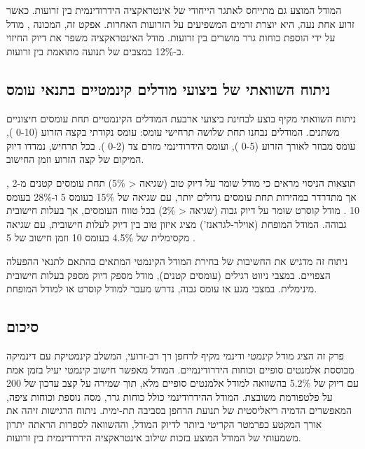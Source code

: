 המודל המוצע גם מתייחס לאתגר הייחודי של אינטראקציה הידרודינמית בין זרועות. כאשר זרוע אחת נעה, היא יוצרת זרמים המשפיעים על הזרועות האחרות. אפקט זה, המכונה , מודל על ידי הוספת כוחות גרר מושרים בין זרועות. מודל האינטראקציה משפר את דיוק החיזוי ב-12\% במצבים של תנועה מתואמת בין זרועות.

\subsection{ניתוח השוואתי של ביצועי מודלים קינמטיים בתנאי עומס}
\label{sec:kinematics_load_analysis}

ניתוח השוואתי מקיף בוצע לבחינת ביצועי ארבעת המודלים הקינמטיים תחת עומסים חיצוניים משתנים. המודלים נבחנו תחת שלושה תרחישי עומס: עומס נקודתי בקצה הזרוע (0-10 ), עומס מבוזר לאורך הזרוע (0-5 ), ועומס הידרודינמי מזרם צד (0-2 ). בכל תרחיש, נמדדו דיוק המיקום של קצה הזרוע וזמן החישוב.

תוצאות הניסוי מראים כי מודל  שומר על דיוק טוב (שגיאה < 5\%) תחת עומסים קטנים מ-2 , אך מתדרדר במהירות תחת עומסים גדולים יותר, עם שגיאה של 15\% בעומס 5  ו-28\% בעומס 10 . מודל קוסרט שומר על דיוק גבוה (שגיאה < 2\%) בכל טווח העומסים, אך בעלות חישובית גבוהה. המודל המופחת (אוילר-לגראנז') מציג איזון טוב בין דיוק לעלות חישובית, עם שגיאה מקסימלית של 4.5\% בעומס 10  וזמן חישוב של 5 .

ניתוח זה מדגיש את החשיבות של בחירת המודל הקינמטי המתאים בהתאם לתנאי ההפעלה הצפויים. במצבי ניווט רגילים (עומסים קטנים), מודל  מספק דיוק מספק בעלות חישובית מינימלית. במצבי מגע או עומס גבוה, נדרש מעבר למודל קוסרט או למודל המופחת.

\subsection{סיכום}
\label{sec:kinematics_summary}

פרק זה הציג מודל קינמטי ודינמי מקיף לרחפן רך רב-זרועי, המשלב קינמטיקת  עם דינמיקה מבוססת אלמנטים סופיים וכוחות הידרודינמיים. המודל מאפשר חישוב קינמטי יעיל בזמן אמת עם דיוק של 5.2\% בהשוואה למודל אלמנטים סופיים מלא, תוך שמירה על קצב עדכון של 200  על פלטפורמת  משובצת. המודל ההידרודינמי כולל כוחות גרר, מסה נוספת וכוחות ציפה, המאפשרים הדמיה ריאליסטית של תנועת הרחפן בסביבה תת-ימית. ניתוח הרגישות זיהה את אורך המקטע כפרמטר הקריטי ביותר לדיוק המודל, וההשוואה לספרות הראתה יתרון משמעותי של המודל המוצע בזכות שילוב אינטראקציה הידרודינמית בין זרועות.

\cite{Webster2010, Jones2006, Renda2018, Rus2015, Laschi2016, Mazzolai2020}


